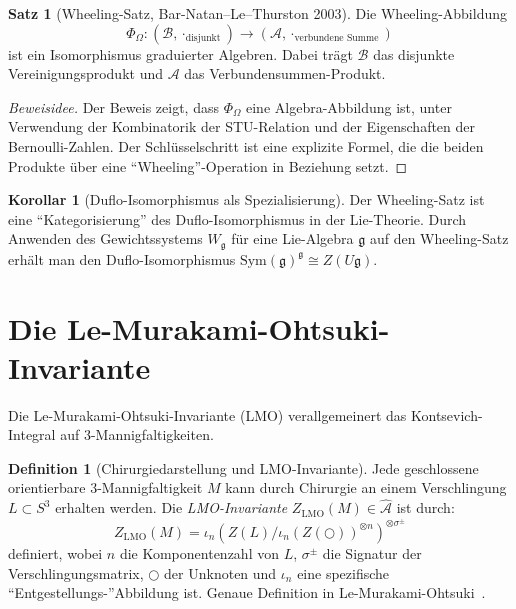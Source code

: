 \documentclass[12pt,a4paper]{amsart}
\theoremstyle{definition}
\newtheorem{satz}[theorem]{Satz}
\newtheorem{korollar}[theorem]{Korollar}
\newtheorem{definition_de}[theorem]{Definition}
\begin{document}
\begin{satz}[Wheeling-Satz, Bar-Natan--Le--Thurston 2003]\label{satz:wheeling}
Die Wheeling-Abbildung
\[
  \Phi_\Omega: (\mathcal{B}, \cdot_{\text{disjunkt}}) \to (\mathcal{A}, \cdot_{\text{verbundene Summe}})
\]
ist ein Isomorphismus graduierter Algebren.  Dabei trägt $\mathcal{B}$
das disjunkte Vereinigungsprodukt und $\mathcal{A}$ das Verbundensummen-Produkt.
\end{satz}

\begin{proof}[Beweisidee]
Der Beweis zeigt, dass $\Phi_\Omega$ eine Algebra-Abbildung ist, unter
Verwendung der Kombinatorik der STU-Relation und der Eigenschaften der
Bernoulli-Zahlen.  Der Schlüsselschritt ist eine explizite Formel, die
die beiden Produkte über eine ``Wheeling''-Operation in Beziehung setzt.
\end{proof}

\begin{korollar}[Duflo-Isomorphismus als Spezialisierung]
Der Wheeling-Satz ist eine ``Kategorisierung'' des Duflo-Isomorphismus
in der Lie-Theorie.  Durch Anwenden des Gewichtssystems $W_{\mathfrak{g}}$
für eine Lie-Algebra $\mathfrak{g}$ auf den Wheeling-Satz erhält man
den Duflo-Isomorphismus
$\mathrm{Sym}(\mathfrak{g})^{\mathfrak{g}} \cong Z(U\mathfrak{g})$.
\end{korollar}

\section{Die Le-Murakami-Ohtsuki-Invariante}\label{sec:LMO}

Die Le-Murakami-Ohtsuki-Invariante (LMO) verallgemeinert das
Kontsevich-Integral auf $3$-Mannigfaltigkeiten.

\begin{definition_de}[Chirurgiedarstellung und LMO-Invariante]
Jede geschlossene orientierbare $3$-Mannigfaltigkeit $M$ kann durch
Chirurgie an einem Verschlingung $L \subset S^3$ erhalten werden.
Die \emph{LMO-Invariante} $Z_{\mathrm{LMO}}(M) \in \hat{\mathcal{A}}$
ist durch:
\[
  Z_{\mathrm{LMO}}(M) = \iota_n\left(Z(L) / \iota_n(Z(\bigcirc))^{\otimes n}\right)^{\otimes \sigma^\pm}
\]
definiert, wobei $n$ die Komponentenzahl von $L$, $\sigma^\pm$ die
Signatur der Verschlingungsmatrix, $\bigcirc$ der Unknoten und $\iota_n$
eine spezifische ``Entgestellungs-''Abbildung ist.
Genaue Definition in Le-Murakami-Ohtsuki~\cite{lmo1998}.
\end{definition_de}
\end{document}
